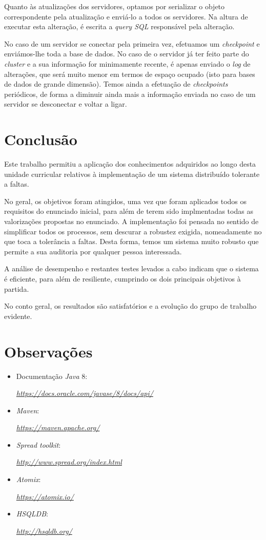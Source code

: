\documentclass[a4paper]{report}
\begin{document}
{\begin{enumerate}
		Quanto às atualizações dos servidores, optamos por serializar o objeto correspondente pela atualização e enviá-lo a todos os servidores. Na altura de executar esta alteração, é escrita a \textit{query SQL} responsável pela alteração.
		
		No caso de um servidor se conectar pela primeira vez, efetuamos um \textit{checkpoint} e enviámos-lhe toda a base de dados. No caso de o servidor já ter feito parte do \textit{cluster} e a sua informação for minimamente recente, é apenas enviado o \textit{log} de alterações, que será muito menor em termos de espaço ocupado (isto para bases de dados de grande dimensão). Temos ainda a efetuação de \textit{checkpoints} periódicos, de forma a diminuir ainda mais a informação enviada no caso de um servidor se desconectar e voltar a ligar.
		
	\end{enumerate}
}

\chapter{Conclusão} \label{ch:Conclusion}
\large{
	Este trabalho permitiu a aplicação dos conhecimentos adquiridos ao longo desta unidade curricular relativos à implementação de um sistema distribuído tolerante a faltas.

	No geral, os objetivos foram atingidos, uma vez que foram aplicados todos os requisitos do enunciado inicial, para além de terem sido implmentadas todas as valorizações propostas no enunciado. A implementação foi pensada no sentido de simplificar todos os processos, sem descurar a robustez exigida, nomeadamente no que toca a tolerância a faltas. Desta forma, temos um sistema muito robusto que permite a sua auditoria por qualquer pessoa interessada.

	A análise de desempenho e restantes testes levados a cabo indicam que o sistema é eficiente, para além de resiliente, cumprindo os dois principais objetivos à partida.

	No conto geral, os resultados são satisfatórios e a evolução do grupo de trabalho evidente.
}

\appendix
\chapter{Observações} \label{ch:Observations}
\begin{itemize}
    \item Documentação \textit{Java} 8:
    \par \textit{\url{https://docs.oracle.com/javase/8/docs/api/}}
	\item \textit{Maven}:
	\par \textit{\url{https://maven.apache.org/}}
	\item \textit{Spread toolkit}:
	\par \textit{\url{http://www.spread.org/index.html}}
	\item \textit{Atomix}:
	\par \textit{\url{https://atomix.io/}}
	\item \textit{HSQLDB}:
	\par \textit{\url{http://hsqldb.org/}}
\end{itemize}
\end{document}
